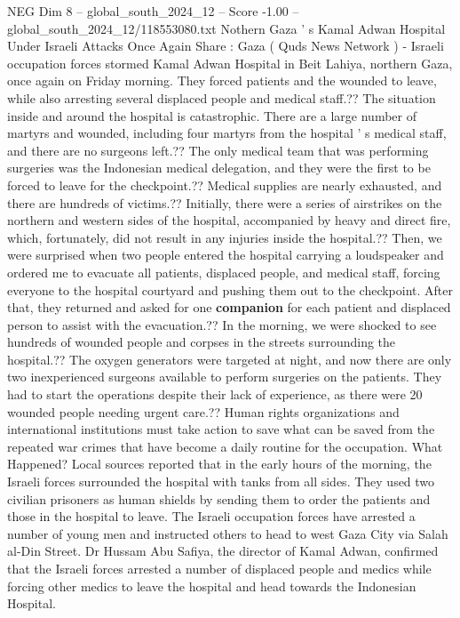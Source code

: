 \begin{textsample}{NEG Dim 8 – global\_south\_2024\_12 – Score -1.00 – global\_south\_2024\_12/118553080.txt}  \label{ex:f8_neg_110}
Nothern Gaza ' s Kamal Adwan Hospital Under Israeli Attacks Once Again Share : Gaza ( Quds News Network ) - Israeli occupation forces stormed Kamal Adwan Hospital in Beit Lahiya, northern Gaza, once again on Friday morning.
They forced patients and the wounded to leave, while also arresting several displaced people and medical staff.??
The situation inside and around the hospital is catastrophic.
There are a large number of martyrs and wounded, including four martyrs from the hospital ' s medical staff, and there are no surgeons left.??
The only medical team that was performing surgeries was the Indonesian medical delegation, and they were the first to be forced to leave for the checkpoint.??
Medical supplies are nearly exhausted, and there are hundreds of victims.??
Initially, there were a series of airstrikes on the northern and western sides of the hospital, accompanied by heavy and direct fire, which, fortunately, did not result in any injuries inside the hospital.??
Then, we were surprised when two people entered the hospital carrying a loudspeaker and ordered me to evacuate all patients, displaced people, and medical staff, forcing everyone to the hospital courtyard and pushing them out to the checkpoint.
After that, they returned and asked for one \textbf{companion} for each patient and displaced person to assist with the evacuation.??
In the morning, we were shocked to see hundreds of wounded people and corpses in the streets surrounding the hospital.??
The oxygen generators were targeted at night, and now there are only two inexperienced surgeons available to perform surgeries on the patients.
They had to start the operations despite their lack of experience, as there were 20 wounded people needing urgent care.??
Human rights organizations and international institutions must take action to save what can be saved from the repeated war crimes that have become a daily routine for the occupation.
What Happened?
Local sources reported that in the early hours of the morning, the Israeli forces surrounded the hospital with tanks from all sides.
They used two civilian prisoners as human shields by sending them to order the patients and those in the hospital to leave.
The Israeli occupation forces have arrested a number of young men and instructed others to head to west Gaza City via Salah al-Din Street.
Dr Hussam Abu Safiya, the director of Kamal Adwan, confirmed that the Israeli forces arrested a number of displaced people and medics while forcing other medics to leave the hospital and head towards the Indonesian Hospital.

\end{textsample}
